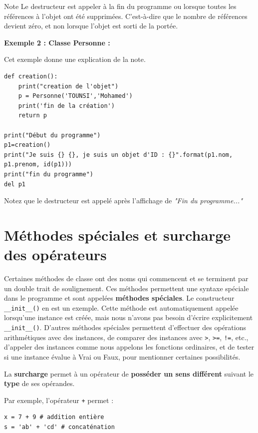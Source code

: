 \documentclass[a4paper,11pt]{article}
\theoremstyle{mytheor}
\begin{document}
\begin{bclogo}[logo=\bcinfo, couleurBarre=orange, noborder=true, couleur=orange!10]{Note}
Le destructeur est appeler à la fin du programme ou lorsque toutes les références à l'objet ont été supprimées. C'est-à-dire que le nombre de références devient zéro, et non lorsque l'objet est sorti de la portée.
\end{bclogo}

\textbf{Exemple 2 : Classe Personne :}

Cet exemple donne une explication de la note.



\begin{lstlisting}
def creation():
	print("creation de l'objet")
	p = Personne('TOUNSI','Mohamed')
	print('fin de la création')
	return p

print("Début du programme")
p1=creation()
print("Je suis {} {}, je suis un objet d'ID : {}".format(p1.nom, p1.prenom, id(p1)))
print("fin du programme")
del p1
\end{lstlisting}

Notez que le destructeur est appelé après l'affichage de \emph{"Fin du programme..."}

\section{Méthodes spéciales et surcharge des opérateurs}
Certaines méthodes de classe ont des noms qui commencent et se terminent par un double trait de soulignement. Ces méthodes permettent une syntaxe spéciale dans le programme et sont appelées \textbf{méthodes spéciales}. Le constructeur \Verb!__init__()! en est un exemple. Cette méthode est automatiquement appelée lorsqu'une instance est créée, mais nous n'avons pas besoin d'écrire explicitement \Verb!__init__()!. D'autres méthodes spéciales permettent d'effectuer des opérations arithmétiques avec des instances, de comparer des instances avec \texttt{>}, \texttt{>=}, \Verb?!=?, etc., d'appeler des instances comme nous appelons les fonctions ordinaires, et de tester si une instance évalue à Vrai ou Faux, pour mentionner certaines possibilités.

La \textbf{surcharge} permet à un opérateur de \textbf{posséder un sens différent} suivant le \textbf{type} de ses opérandes.

Par exemple, l'opérateur \texttt{+} permet :
\begin{lstlisting}
x = 7 + 9 # addition entière
s = 'ab' + 'cd' # concaténation
\end{lstlisting}
\end{document}
